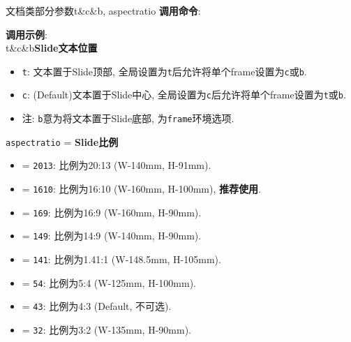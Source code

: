 \begin{frame}{文档类部分参数}{t\&c\&b, aspectratio}
	\textbf{调用命令}: 

  \textbf{调用示例}: \\

	\alert{\ttfamily t}\&\alert{\ttfamily c}\&\alert{\ttfamily b}\hfill \textbf{Slide文本位置}
	\begin{itemize}
		\item \texttt{t}: 文本置于Slide顶部, 全局设置为\texttt{t}后允许将单个frame设置为\texttt{c}或\texttt{b}.
		\item \texttt{c}: (Default)文本置于Slide中心, 全局设置为\texttt{c}后允许将单个frame设置为\texttt{t}或\texttt{b}.
		\item 注: \texttt{b}意为将文本置于Slide底部, 为\texttt{frame}环境选项.
	\end{itemize}

	\vspace*{1ex}\alert{\texttt{aspectratio} = }\hfill \textbf{Slide比例}
	\begin{itemize}
		\item {} = \texttt{2013}: 比例为20:13 (W-140mm, H-91mm).
		\item {} = \texttt{1610}: 比例为16:10 (W-160mm, H-100mm), \textbf{推荐使用}.
		\item {} = \texttt{169}: 比例为16:9 (W-160mm, H-90mm).
		\item {} = \texttt{149}: 比例为14:9 (W-140mm, H-90mm).
		\item {} = \texttt{141}: 比例为1.41:1 (W-148.5mm, H-105mm).
		\item {} = \texttt{54}: 比例为5:4 (W-125mm, H-100mm).
		\item {} = \texttt{43}: 比例为4:3 (Default, 不可选).
		\item {} = \texttt{32}: 比例为3:2 (W-135mm, H-90mm).
	\end{itemize}
\end{frame}

